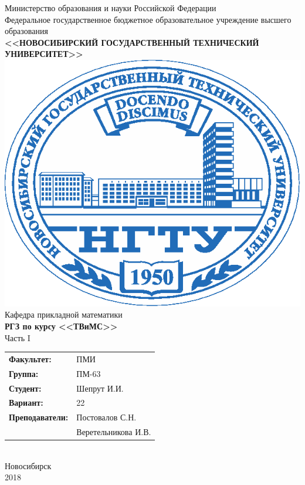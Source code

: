 \documentclass[12pt]{article}
\begin{document}
\begin{center}
\hfill \break
{\Large Министерство образования и науки Российской Федерации}\\
\hfill \break
{\large Федеральное государственное бюджетное образовательное учреждение высшего образования}\\ 
{\normalsize\textbf{<<НОВОСИБИРСКИЙ ГОСУДАРСТВЕННЫЙ ТЕХНИЧЕСКИЙ УНИВЕРСИТЕТ>>}}\\
\hfill \break
\includegraphics{nstu_logo.eps}\\
{\large Кафедра прикладной математики}\\
\hfill \break
\hfill \break
\hfill \break
{\Large\textbf{РГЗ по курсу <<ТВиМС>>}}\\
\hfill \break 
{\Large Часть I}\\
\hfill \break
\hfill \break
\hfill \break
\hfill \break
\hfill \break
\begin{tabu}{ll}
\textbf{Факультет:} & ПМИ \\
\textbf{Группа:} & ПМ-63 \\
\textbf{Студент:} & Шепрут И.И. \\
\textbf{Вариант:} & 22 \\
\textbf{Преподаватели:} & Постовалов С.Н.\\
&Веретельникова И.В. \\
\end{tabu} \\
\hfill \break
\hfill \break
\hfill \break
\hfill \break
\hfill \break
\hfill \break
\hfill \break
\hfill \break
{\large Новосибирск\\2018}
\end{center}
\thispagestyle{empty}
\newpage 
\setcounter{page}{1}
\end{document}
